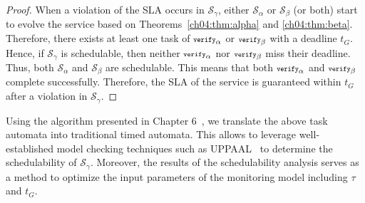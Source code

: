 \begin{proof}
When a violation of the SLA occurs in $\mathcal{S}_\gamma$, either $\mathcal{S}_\alpha$ or $\mathcal{S}_\beta$ (or both) start to evolve the service based on Theorems~\ref{ch04:thm:alpha} and \ref{ch04:thm:beta}.
Therefore, there exists at least one task of ${\scriptsize\texttt{verify}}_\alpha$ or ${\scriptsize\texttt{verify}}_\beta$ with a deadline $t_G$.
% 
Hence, if $\mathcal{S}_\gamma$ is schedulable, then neither ${\scriptsize\texttt{verify}}_\alpha$ nor ${\scriptsize\texttt{verify}}_\beta$ miss their deadline.
Thus, both $\mathcal{S}_\alpha$ and $\mathcal{S}_\beta$ are schedulable.
This means that both ${\scriptsize\texttt{verify}}_\alpha$ and ${\scriptsize\texttt{verify}}_\beta$ complete successfully.
Therefore, the SLA of the service is guaranteed within $t_G$ after a violation in $\mathcal{S}_\gamma$.
\end{proof}

Using the algorithm presented in Chapter 6~\cite{jaghoori2010time}, we translate the above task automata into traditional timed automata.
This allows to leverage well-established model checking techniques such as UPPAAL~\cite{uppaal2004} to determine the schedulability of $\mathcal{S}_\gamma$.
Moreover, the results of the schedulability analysis serves as a method to optimize the input parameters of the monitoring model including $\tau$ and $t_G$.